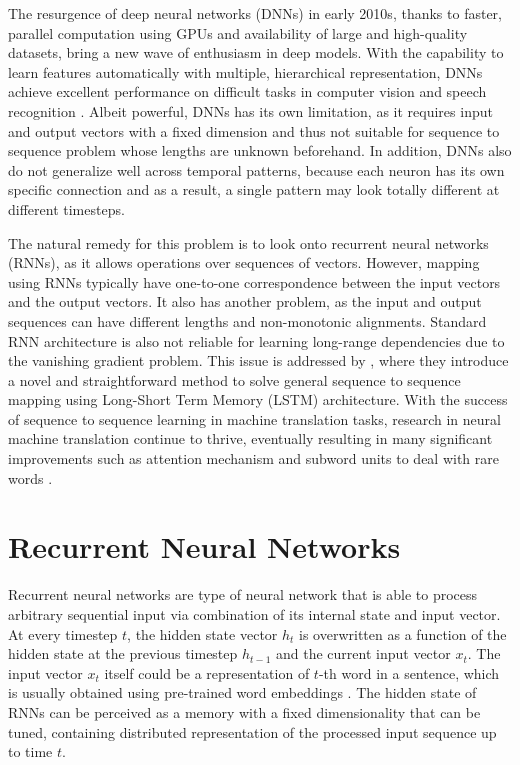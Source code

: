 \documentclass[12pt]{extarticle}
\begin{document}
The resurgence of deep neural networks (DNNs) in early 2010s, thanks to faster, parallel computation using GPUs and availability of large and high-quality datasets, bring a new wave of enthusiasm in deep models. With the capability to learn features automatically with multiple, hierarchical representation, DNNs achieve excellent performance on difficult tasks in computer vision \citep{Krizhevsky:2012:ICD:2999134.2999257} and speech recognition \citep{ASR}. Albeit powerful, DNNs has its own limitation, as it requires input and output vectors with a fixed dimension and thus not suitable for sequence to sequence problem whose lengths are unknown beforehand. In addition, DNNs also do not generalize well across temporal patterns, because each neuron has its own specific connection and as a result, a single pattern may look totally different at different timesteps. 

The natural remedy for this problem is to look onto recurrent neural networks (RNNs), as it allows operations over sequences of vectors. However, mapping using RNNs typically have one-to-one correspondence between the input vectors and the output vectors. It also has another problem, as the input and output sequences can have different lengths and non-monotonic alignments. Standard RNN architecture is also not reliable for learning long-range dependencies due to the vanishing gradient problem. This issue is addressed by \citep{Sutskever:2014:SSL:2969033.2969173} , where they introduce a novel and straightforward method to solve general sequence to sequence mapping using Long-Short Term Memory (LSTM) architecture. With the success of sequence to sequence learning in machine translation tasks, research in neural machine translation continue to thrive, eventually resulting in many significant improvements such as attention mechanism \citep{DBLP:journals/corr/BahdanauCB14} and subword units to deal with rare words \citep{sennrich-etal-2016-neural}.

\section*{Recurrent Neural Networks} %

Recurrent neural networks \citep{Rumelhart:1986we} are type of neural network that is able to process arbitrary sequential input via combination of its internal state and input vector. At every timestep $t$, the hidden state vector $h_{t}$ is overwritten as a function of the hidden state at the previous timestep $h_{t-1}$ and the current input vector $x_{t}$. The input vector $x_{t}$ itself could be a representation of $t$-th word in a sentence, which is usually obtained using pre-trained word embeddings \citep{DBLP:journals/corr/abs-1301-3781, pennington-etal-2014-glove, Peters:2018}. The hidden state of RNNs can be perceived as a memory with a fixed dimensionality that can be tuned, containing distributed representation of the processed input sequence up to time $t$. 
\end{document}

